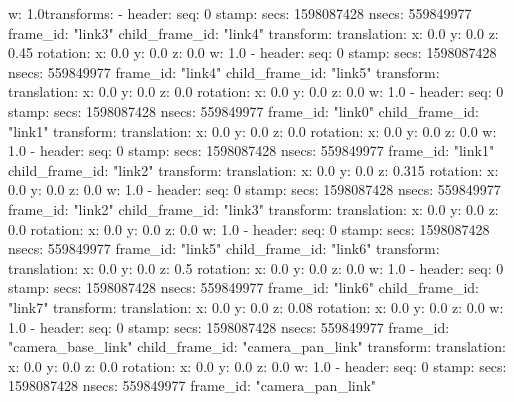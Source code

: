         w: 1.0transforms: 
  - 
    header: 
      seq: 0
      stamp: 
        secs: 1598087428
        nsecs: 559849977
      frame_id: "link3"
    child_frame_id: "link4"
    transform: 
      translation: 
        x: 0.0
        y: 0.0
        z: 0.45
      rotation: 
        x: 0.0
        y: 0.0
        z: 0.0
        w: 1.0
  - 
    header: 
      seq: 0
      stamp: 
        secs: 1598087428
        nsecs: 559849977
      frame_id: "link4"
    child_frame_id: "link5"
    transform: 
      translation: 
        x: 0.0
        y: 0.0
        z: 0.0
      rotation: 
        x: 0.0
        y: 0.0
        z: 0.0
        w: 1.0
  - 
    header: 
      seq: 0
      stamp: 
        secs: 1598087428
        nsecs: 559849977
      frame_id: "link0"
    child_frame_id: "link1"
    transform: 
      translation: 
        x: 0.0
        y: 0.0
        z: 0.0
      rotation: 
        x: 0.0
        y: 0.0
        z: 0.0
        w: 1.0
  - 
    header: 
      seq: 0
      stamp: 
        secs: 1598087428
        nsecs: 559849977
      frame_id: "link1"
    child_frame_id: "link2"
    transform: 
      translation: 
        x: 0.0
        y: 0.0
        z: 0.315
      rotation: 
        x: 0.0
        y: 0.0
        z: 0.0
        w: 1.0
  - 
    header: 
      seq: 0
      stamp: 
        secs: 1598087428
        nsecs: 559849977
      frame_id: "link2"
    child_frame_id: "link3"
    transform: 
      translation: 
        x: 0.0
        y: 0.0
        z: 0.0
      rotation: 
        x: 0.0
        y: 0.0
        z: 0.0
        w: 1.0
  - 
    header: 
      seq: 0
      stamp: 
        secs: 1598087428
        nsecs: 559849977
      frame_id: "link5"
    child_frame_id: "link6"
    transform: 
      translation: 
        x: 0.0
        y: 0.0
        z: 0.5
      rotation: 
        x: 0.0
        y: 0.0
        z: 0.0
        w: 1.0
  - 
    header: 
      seq: 0
      stamp: 
        secs: 1598087428
        nsecs: 559849977
      frame_id: "link6"
    child_frame_id: "link7"
    transform: 
      translation: 
        x: 0.0
        y: 0.0
        z: 0.08
      rotation: 
        x: 0.0
        y: 0.0
        z: 0.0
        w: 1.0
  - 
    header: 
      seq: 0
      stamp: 
        secs: 1598087428
        nsecs: 559849977
      frame_id: "camera_base_link"
    child_frame_id: "camera_pan_link"
    transform: 
      translation: 
        x: 0.0
        y: 0.0
        z: 0.0
      rotation: 
        x: 0.0
        y: 0.0
        z: 0.0
        w: 1.0
  - 
    header: 
      seq: 0
      stamp: 
        secs: 1598087428
        nsecs: 559849977
      frame_id: "camera_pan_link"
